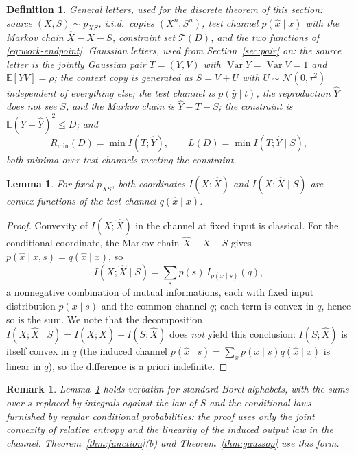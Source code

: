 \documentclass[11pt,onecolumn]{IEEEtran}
\newtheorem{lemma}[theorem]{Lemma}
\newtheorem{remark}[theorem]{Remark}
\newtheorem{definition}[theorem]{Definition}
\newcommand{\E}{\mathbb{E}}
\newcommand{\hX}{\widehat{X}}
\newcommand{\hY}{\widehat{Y}}
\begin{document}
\begin{definition}\label{def:problem}
\emph{General letters}, used for the discrete theorem of this section:
source $(X,S)\sim p_{XS}$, i.i.d.\ copies $(X^n,S^n)$, test channel
$p(\hat x\mid x)$ with the Markov chain $\hX-X-S$, constraint set
$\mathcal T(D)$, and the two functions of \eqref{eq:work-endpoint}.
\emph{Gaussian letters}, used from Section~\ref{sec:pair} on: the source
letter is the jointly Gaussian pair $T=(Y,V)$ with
$\operatorname{Var}Y=\operatorname{Var}V=1$ and $\E[YV]=\rho$; the context
copy is generated as $S=V+U$ with $U\sim\mathcal N(0,\tau^2)$ independent
of everything else; the test channel is $p(\hat y\mid t)$, the reproduction
$\hY$ does not see $S$, and the Markov chain is $\hY-T-S$; the constraint
is $\E(Y-\hY)^2\le D$; and
\[
R_{\min}(D)=\min I(T;\hY),
\qquad
L(D)=\min I(T;\hY\mid S),
\]
both minima over test channels meeting the constraint.
\end{definition}

\begin{lemma}\label{lem:convexity}
For fixed $p_{XS}$, both coordinates $I(X;\hX)$ and $I(X;\hX\mid S)$ are
convex functions of the test channel $q(\hat x\mid x)$.
\end{lemma}

\begin{proof}
Convexity of $I(X;\hX)$ in the channel at fixed input is classical. For the
conditional coordinate, the Markov chain $\hX-X-S$ gives
$p(\hat x\mid x,s)=q(\hat x\mid x)$, so
\begin{equation}
 I(X;\hX\mid S)=\sum_s p(s)\,I_{p(x\mid s)}(q),
 \label{eq:per-s-decomposition}
\end{equation}
a nonnegative combination of mutual informations, each with fixed input
distribution $p(x\mid s)$ and the common channel $q$; each term is convex in
$q$, hence so is the sum. We note that the decomposition
$I(X;\hX\mid S)=I(X;\hX)-I(S;\hX)$ does \emph{not} yield this conclusion:
$I(S;\hX)$ is itself convex in $q$ (the induced channel
$p(\hat x\mid s)=\sum_x p(x\mid s)q(\hat x\mid x)$ is linear in $q$), so the
difference is a priori indefinite.
\end{proof}

\begin{remark}\label{rem:convgeneral}
Lemma~\ref{lem:convexity} holds verbatim for standard Borel alphabets,
with the sums over $s$ replaced by integrals against the law of $S$ and
the conditional laws furnished by regular conditional probabilities: the
proof uses only the joint convexity of relative entropy
\cite{csiszar1967} and the linearity of the induced output law in the
channel. Theorem~\ref{thm:function}(b) and Theorem~\ref{thm:gaussop}
use this form.
\end{remark}
\end{document}
